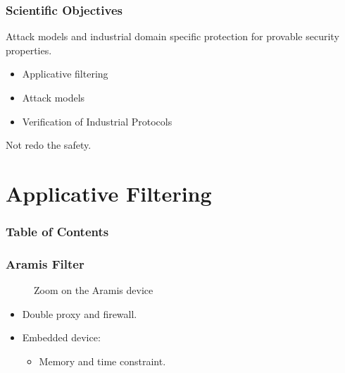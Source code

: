 \documentclass{beamer}
\newcommand{\aramis}{Aramis\xspace}
\begin{document}
\begin{frame}
    \frametitle{Scientific Objectives}
    
    Attack models and industrial domain specific protection for provable security properties.
    \vfill
    \begin{itemize}
        \item Applicative filtering
            \vfill
        \item Attack models
            \vfill
        \item Verification of Industrial Protocols
    \end{itemize}
    \vfill
    Not redo the safety.
\end{frame}

\section{Applicative Filtering}

\begin{frame}
    \frametitle{Table of Contents}
    
    \tableofcontents[currentsection]
\end{frame}

\begin{frame}
    \frametitle{\aramis Filter}

    \begin{figure}[htb]
        \resizebox{\columnwidth}{!}{
            
        }
        \caption{Zoom on the \aramis device}
    \end{figure}
    \vspace{-1.3em}
    \begin{itemize}
        \item Double proxy and firewall.
            \vfill
        \item Embedded device:
        \begin{itemize}
            \item Memory and time constraint.
        \end{itemize}
    \end{itemize}
\end{frame}
\end{document}
